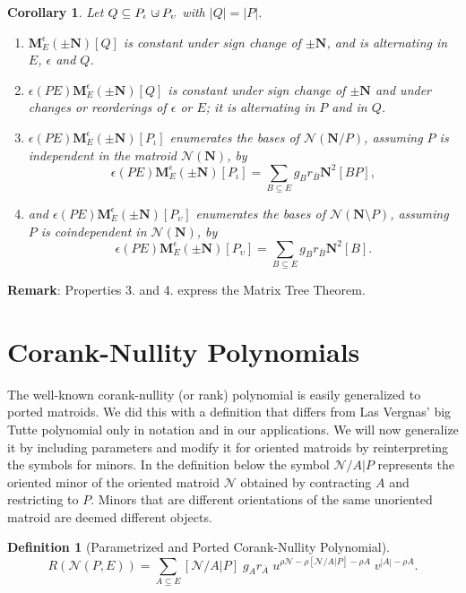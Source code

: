 \documentclass[12pt]{article}
\newtheorem{corollary}[theorem]{Corollary}
\theoremstyle{definition}
\newtheorem{definition}[theorem]{Definition}
\newcommand{\Remark}{\textbf{Remark}}
\newcommand{\MVAR}[1]{{[#1]\;}}
\newcommand{\dunion}
{\mbox{\hbox{\hskip6pt$\cdot$\hskip-5.50pt$\cup$\hskip2pt}}}
\newcommand{\scomp}[1]{\ensuremath{\overline{#1}}}
\newcommand{\Is}{\ensuremath{\iota}}
\newcommand{\Vs}{\ensuremath{\upsilon}}
\newcommand{\Rank}{{\rho}}%
\newcommand{\Card}[1]{\ensuremath{{\left|#1\right|}}}
\newcommand{\ext}[1]{\ensuremath{\mathbf{#1}}}
\begin{document}
\begin{corollary}
\label{BasisCountCorollary}
Let $Q\subseteq P_{\Is}\dunion P_{\Vs}$ with $\Card{Q}=\Card{P}$.
\begin{enumerate}
\item $\ext{M}^\epsilon_E(\pm \ext{N})[Q]$ is constant under sign change of
$\pm \ext{N}$, and is alternating in $E$, $\epsilon$ and $Q$.
\item $\epsilon(PE)\ext{M}^\epsilon_E(\pm \ext{N})[Q]$ 
is constant under sign
change of $\pm \ext{N}$ and under changes or reorderings of 
$\epsilon$ or  $E$; it
is alternating in $P$ and in $Q$.
\item $\epsilon(PE)\ext{M}^\epsilon_E(\pm \ext{N})[P_{\Is}]$
enumerates the bases of
$\mathcal{N}(\ext{N}/P)$, assuming $P$ is independent in the matroid 
$\mathcal{N}(\ext{N})$, by
\[
\epsilon(PE)\ext{M}^\epsilon_E(\pm \ext{N})[P_{\Is}]=
\sum_{B\subseteq E} g_Br_{\scomp{B}}\ext{N}^2[BP],
\]
\item and $\epsilon(PE)\ext{M}^\epsilon_E(\pm \ext{N})[P_{\Vs}]$ 
enumerates the bases of
$\mathcal{N}(\ext{N}\setminus P)$,  
assuming $P$ is coindependent in 
$\mathcal{N}(\ext{N})$, by\[
\epsilon(PE)\ext{M}^\epsilon_E(\pm \ext{N})[P_{\Vs}]=
\sum_{B\subseteq E} g_Br_{\scomp{B}}\ext{N}^2[B].
\]
\end{enumerate}
\end{corollary}

\Remark: Properties 3. and 4. express the Matrix Tree Theorem.

\section{Corank-Nullity Polynomials}
\label{Classify}

The well-known corank-nullity (or rank) polynomial is easily
generalized to ported matroids.  
We did\cite{sdcPorted} this
with a definition that differs from 
Las Vergnas' 
big Tutte polynomial \cite{SetPointedLV}
only in notation and in our applications.
We will now generalize it by including parameters and modify it
for oriented matroids by reinterpreting the symbols
for minors.
In the definition below
the symbol $\mathcal{N}/A|P$ represents the oriented minor
of the oriented matroid $\mathcal{N}$ obtained by contracting
$A$ and restricting to $P$.  Minors that are
different orientations of the same unoriented matroid are deemed
different objects.

\begin{definition}[Parametrized and Ported Corank-Nullity Polynomial]
\label{definitionRankPoly}
\[
R(\mathcal{N}(P,E))=\sum_{A\subseteq E}
	\MVAR{\mathcal{N}/A|P}g_Ar_{\scomp{A}}\;
	u^{\Rank{\mathcal{N}}-\Rank{[\mathcal{N}/A|P]}-\Rank{A}}\;
	v^{\Card{A}-\Rank{A}}.
\]
\end{definition}
\end{document}
